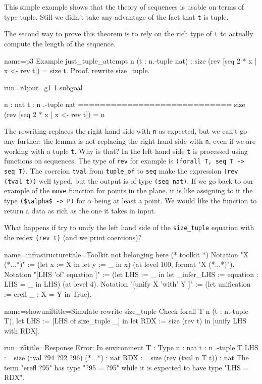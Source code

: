 This simple example shows that the theory of sequences is usable
on terms of type tuple.  Still we didn't take any advantage of
the fact that  \lstinline/t/ is tuple.

The second way to prove this theorem is to rely on the rich type
of \lstinline/t/ to actually compute the length of the sequence.

\begin{coq}{name=p3}{}
Example just_tuple_attempt n (t : n.-tuple nat) :
  size (rev [seq 2 * x | x <- rev t]) = size t.
Proof. rewrite size_tuple.
\end{coq}
\begin{coqout}{run=r4;out=g1}{}
1 subgoal

 n : nat
 t : n .-tuple nat
 ============================
 size (rev [seq 2 * x | x <- rev t]) = n
\end{coqout}

The rewriting replaces the right hand side with \lstinline/n/ as
expected, but we can't go any further: the lemma is not replacing
the right hand side with \lstinline/n/, even if we are working
with a tuple \lstinline/t/.  Why is that?  In the left hand side
\lstinline/t/ is processed using functions on sequences.
The type of \lstinline/rev/ for example is
\lstinline/(forall T, seq T -> seq T)/.  The coercion \lstinline/tval/
from \lstinline/tuple_of/ to \lstinline/seq/ make the
expression \lstinline/(rev (tval t))/ well typed, but the output
is of type \lstinline/(seq nat)/.  If we go back to our example
of the \lstinline/move/ function for points in the plane, it is like
assigning to it the type \lstinline/($\alpha$ -> P)/ for $\alpha$
being at least a point.  We would like the function to return
a data as rich as the one it takes in input.

What happens if try to unify the left hand side of the
\lstinline/size_tuple/ equation with the redex
\lstinline/(rev t)/ (and we print coercions)?

\begin{coq}{name=infrastructure}{title=Toolkit not belonging here}
(* toolkit *)
Notation "X (*...*)" := (let x := X in let y := _ in x)
  (at level 100, format "X  (*...*)").
Notation "[LHS 'of' equation ]" :=
  (let LHS := _ in
   let _infer_LHS := equation : LHS = _ in LHS)
  (at level 4).
Notation "[unify X 'with' Y ]" :=
  (let unification := erefl _ : X = Y in
   True).
\end{coq}

\begin{coq}{name=showunif}{title=Simulate rewrite size\_tuple}
Check forall T n (t : n.-tuple T),
 let LHS := [LHS of size_tuple _] in
 let RDX := size (rev t) in
 [unify LHS with RDX].
\end{coq}
\begin{coqout}{run=r5}{title=Response}
Error:
In environment
T : Type
n : nat
t : n .-tuple T
LHS := size (tval ?94 ?92 ?96) (*...*) : nat
RDX := size (rev (tval n T t))           : nat
The term "erefl ?95" has type "?95 = ?95" while
it is expected to have type "LHS = RDX".
\end{coqout}

